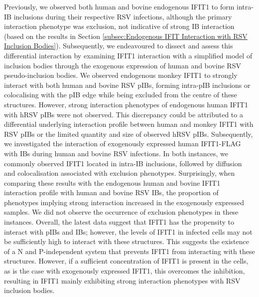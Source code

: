 Previously, we observed both human and bovine endogenous IFIT1 to form intra-IB inclusions during their respective RSV infections, although the primary interaction phenotype was exclusion, not indicative of strong IB interaction (based on the results in Section \ref{subsec:Endogenous IFIT Interaction with RSV Inclusion Bodies}). Subsequently, we endeavoured to dissect and assess this differential interaction by examining IFIT1 interaction with a simplified model of inclusion bodies through the exogenous expression of human and bovine RSV pseudo-inclusion bodies. We observed endogenous monkey IFIT1 to strongly interact with both human and bovine RSV pIBs, forming intra-pIB inclusions or colocalising with the pIB edge while being excluded from the centre of these structures. However, strong interaction phenotypes of endogenous human IFIT1 with hRSV pIBs were not observed. This discrepancy could be attributed to a differential underlying interaction profile between human and monkey IFIT1 with RSV pIBs or the limited quantity and size of observed hRSV pIBs. Subsequently, we investigated the interaction of exogenously expressed human IFIT1-FLAG with IBs during human and bovine RSV infections. In both instances, we commonly observed IFIT1 located in intra-IB inclusions, followed by diffusion and colocalisation associated with exclusion phenotypes. Surprisingly, when comparing these results with the endogenous human and bovine IFIT1 interaction profile with human and bovine RSV IBs, the proportion of phenotypes implying strong interaction increased in the exogenously expressed samples. We did not observe the occurrence of exclusion phenotypes in these instances. Overall, the latest data suggest that IFIT1 has the propensity to interact with pIBs and IBs; however, the levels of IFIT1 in infected cells may not be sufficiently high to interact with these structures. This suggests the existence of a N and P-independent system that prevents IFIT1 from interacting with these structures. However, if a sufficient concentration of IFIT1 is present in the cells, as is the case with exogenously expressed IFIT1, this overcomes the inhibition, resulting in IFIT1 mainly exhibiting strong interaction phenotypes with RSV inclusion bodies.

